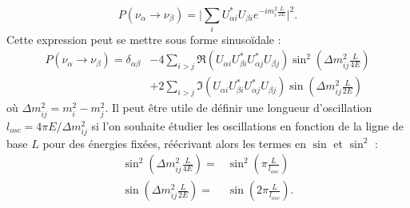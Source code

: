             \begin{equation*}
                P(\nu_{\alpha}\to\nu_{\beta}) = \bigg|\sum_i U_{\alpha i}^*U_{\beta i} e^{-im_i^2\frac{L}{2E}}\bigg|^2.
            \end{equation*}
            Cette expression peut se mettre sous forme sinusoïdale\cite{Mondal2015} :
            \begin{equation}\label{eq::proba_oscillation}
                \begin{split}
                    P(\nu_{\alpha}\to\nu_{\beta}) = \delta_{\alpha\beta} & - 4\sum_{i>j}\Re(U_{\alpha i}U_{\beta i}^*U_{\alpha j}^*U_{\beta j})\sin^2\left(\Delta m_{ij}^2\frac{L}{4E}\right) \\
                    & +2\sum_{i>j}\Im(U_{\alpha i}U_{\beta i}^*U_{\alpha j}^*U_{\beta j})\sin\left(\Delta m_{ij}^2\frac{L}{2E}\right)
                \end{split}
            \end{equation}
            où $\Delta m_{ij}^2 = m_i^2-m_j^2$. Il peut être utile de définir une longueur d'oscillation $l_{osc} = 4\pi E/\Delta m_{ij}^2$ si l'on souhaite étudier les oscillations en fonction de la ligne de base $L$ pour des énergies fixées, réécrivant alors les termes en $\sin$ et $\sin^2$ :
            \begin{eqnarray}
                \sin^2\left(\Delta m_{ij}^2\frac{L}{4E}\right) = &  \sin^2\left(\pi\frac{L}{l_{osc}}\right) \\
                \sin\left(\Delta m_{ij}^2\frac{L}{2E}\right) = & \sin\left(2\pi\frac{L}{l_{osc}}\right).
            \end{eqnarray}
            
